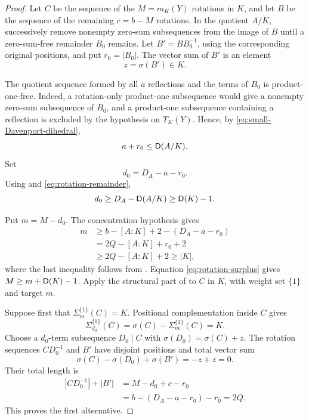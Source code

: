 \begin{proof}
Let \(C\) be the sequence of the \(M=m_K(Y)\) rotations in \(K\), and
let \(B\) be the sequence of the remaining \(c=b-M\) rotations. In the
quotient \(A/K\), successively remove nonempty zero-sum subsequences
from the image of \(B\) until a zero-sum-free remainder \(B_0\)
remains. Let \(B'=BB_0^{-1}\), using the corresponding original
positions, and put \(r_0=|B_0|\). The vector sum of \(B'\) is an
element
\begin{equation}\label{eq:rotation-defect}
  z=\sigma(B')\in K.
\end{equation}

The quotient sequence formed by all \(a\) reflections and the terms of
\(B_0\) is product-one-free. Indeed, a rotation-only product-one
subsequence would give a nonempty zero-sum subsequence of \(B_0\), and
a product-one subsequence containing a reflection is excluded by the
hypothesis on \(T_K(Y)\). Hence, by
\eqref{eq:small-Davenport-dihedral},
\begin{equation}\label{eq:rotation-remainder}
  a+r_0\le \mathsf D(A/K).
\end{equation}
Set
\[
  d_0=D_A-a-r_0.
\]
Using  and
\eqref{eq:rotation-remainder},
\begin{equation}\label{eq:rotation-surplus}
  d_0\ge D_A-\mathsf D(A/K)\ge \mathsf D(K)-1.
\end{equation}

Put \(m=M-d_0\). The concentration hypothesis gives
\begin{align*}
  m&\ge b-[A:K]+2-(D_A-a-r_0)\\
   &=2Q-[A:K]+r_0+2\\
   &\ge 2Q-[A:K]+2\ge |K|,
\end{align*}
where the last inequality follows from
. Equation \eqref{eq:rotation-surplus} gives
\(M\ge m+\mathsf D(K)-1\). Apply the structural part of
 to \(C\) in \(K\), with weight set \(\{1\}\) and
target \(m\).

Suppose first that \(\Sigma_m^{\{1\}}(C)=K\). Positional
complementation inside \(C\) gives
\[
  \Sigma_{d_0}^{\{1\}}(C)
  =\sigma(C)-\Sigma_m^{\{1\}}(C)=K.
\]
Choose a \(d_0\)-term subsequence \(D_0\mid C\) with
\(\sigma(D_0)=\sigma(C)+z\). The rotation sequences
\(CD_0^{-1}\) and \(B'\) have disjoint positions and total vector sum
\[
  \sigma(C)-\sigma(D_0)+\sigma(B')=-z+z=0.
\]
Their total length is
\begin{align*}
  |CD_0^{-1}|+|B'|
  &=M-d_0+c-r_0\\
  &=b-(D_A-a-r_0)-r_0=2Q.
\end{align*}
This proves the first alternative.


\end{proof}
